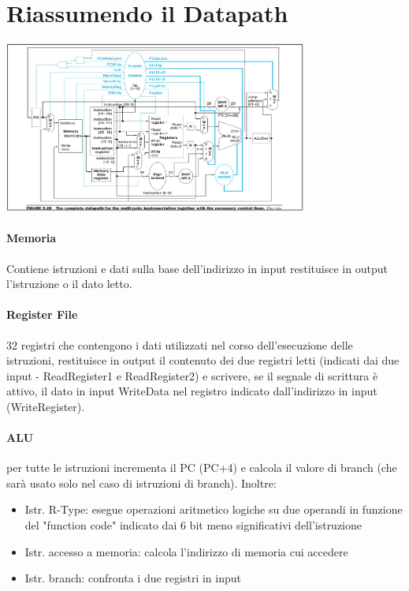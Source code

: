 \documentclass[12pt, a4paper, openany]{book}
\begin{document}
\section{Riassumendo il Datapath}
\begin{center}
    \includegraphics[width=100mm, scale=0.5]{Datapath.png}    
\end{center}
\paragraph*{Memoria} Contiene istruzioni e dati sulla base dell'indirizzo in input
restituisce in output l'istruzione o il dato letto.
\paragraph*{Register File} 32 registri che contengono i dati utilizzati nel corso
dell'esecuzione delle istruzioni, restituisce in output il contenuto dei due registri
letti (indicati dai due input - ReadRegister1 e ReadRegister2) e scrivere, se il segnale
di scrittura è attivo, il dato in input WriteData nel registro indicato dall'indirizzo
in input (WriteRegister).
\paragraph*{ALU} per tutte le istruzioni incrementa il PC (PC+4) e calcola il valore
di branch (che sarà usato solo nel caso di istruzioni di branch).
Inoltre:
\begin{itemize}
    \item Istr. R-Type: esegue operazioni aritmetico logiche su due operandi in funzione
    del "function code" indicato dai 6 bit meno significativi dell'istruzione
    \item Istr. accesso a memoria: calcola l'indirizzo di memoria cui accedere
    \item Istr. branch: confronta i due registri in input
\end{itemize}
\end{document}

